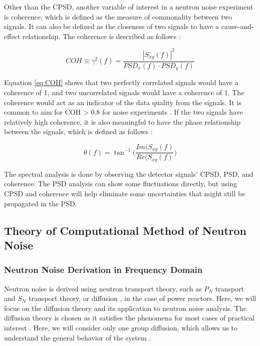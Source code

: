 Other than the CPSD, another variable of interest in a neutron noise experiment is coherence, which is defined as the measure of commonality between two signals. It can also be defined as the closeness of two signals to have a cause-and-effect relationship. The coherence is described as follows \cite{fryAnalysisNeutrondensityOscillations1975}:

\begin{equation}
    COH \equiv \gamma^2 (f) = \frac{|S_{xy} (f)|^2}{PSD_x (f) \cdot PSD_y (f)}
    \label{eq:COH}
\end{equation}

Equation \ref{eq:COH} shows that two perfectly correlated signals would have a coherence of 1, and two uncorrelated signals would have a coherence of 1. The coherence would act as an indicator of the data quality from the signals. It is common to aim for COH > 0.8 for noise experiments \cite{ambrozicNoiseAnalysisTechniques2020}. If the two signals have relatively high coherence, it is also meaningful to have the phase relationship between the signals, which is defined as follows \cite{fryAnalysisNeutrondensityOscillations1975}:

\begin{equation}
    \theta (f) = \tan^{-1} \biggr( \frac{Im(S_{xy} (f)}{Re(S_{xy} (f)} \biggr)
\end{equation}

The spectral analysis is done by observing the detector signals’ CPSD, PSD, and coherence. The PSD analysis can show some fluctuations directly, but using CPSD and coherence will help eliminate some uncertainties that might still be propagated in the PSD.

\subsection{Theory of Computational Method of Neutron Noise}

\subsubsection{Neutron Noise Derivation in Frequency Domain}

Neutron noise is derived using neutron transport theory, such as $P_N$ transport and $S_N$ transport theory, or diffusion \cite{bahramiNewApproachCalculation2020, demaziereDevelopment2D2group2004}, in the case of power reactors. Here, we will focus on the diffusion theory and its application to neutron noise analysis. The diffusion theory is chosen as it satisfies the phenomena for most cases of practical interest \cite{pazsitNoiseTechniquesNuclear2010}. Here, we will consider only one group diffusion, which allows us to understand the general behavior of the system \cite{pazsitNoiseTechniquesNuclear2010}. 

